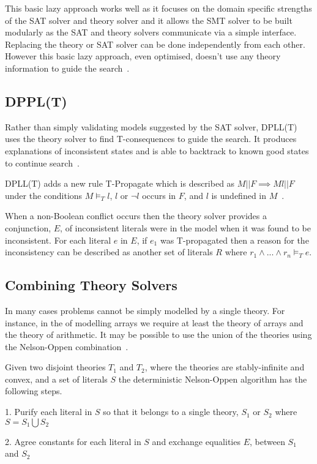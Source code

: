 \documentclass[]{final_report}
\begin{document}
This basic lazy approach works well as it focuses on the domain specific strengths of the SAT solver and theory solver and it allows the SMT solver to be built modularly as the SAT and theory solvers communicate via a simple interface. Replacing the theory or SAT solver can be done independently from each other. However this basic lazy approach, even optimised, doesn't use any theory information to guide the search~\cite{sattosmt}.

\subsection{DPPL(T)}
Rather than simply validating models suggested by the SAT solver, DPLL(T) uses the theory solver to find T-consequences to guide the search. It produces explanations of inconsistent states and is able to backtrack to known good states to continue search~\cite{smtdpplt, ganzinger2004dpll}.

DPLL(T) adds a new rule T-Propagate which is described as $M || F \implies M l || F $ under the conditions $M \models _T l$, $l$ or $\lnot l$ occurs in $F$, and $l$ is undefined in $M$~\cite{sattosmt}.

When a non-Boolean conflict occurs then the theory solver provides a conjunction, $E$, of inconsistent literals were in the model when it was found to be inconsistent.  For each literal $e $ in $E$, if $e_1$ was T-propagated then a reason for the inconsistency can be described as another set of literals $R$ where $r_1 \land ... \land r_n \models _T e$. 

\subsection{Combining Theory Solvers}
In many cases problems cannot be simply modelled by a single theory. For instance, in the of modelling arrays we require at least the theory of arrays and the theory of arithmetic. It may be possible to use the union of the theories using the Nelson-Oppen combination~\cite{smtdpplt}.

Given two disjoint theories $T_1$ and $T_2$, where the theories are stably-infinite and convex, and a set of literals $S$ the deterministic Nelson-Oppen algorithm has the following steps.

1. Purify each literal in $S$ so that it belongs to a single theory, $S_1$ or $S_2$ where $S = S_1 \bigcup S_2$

2. Agree constants for each literal in $S$ and exchange equalities $E$, between $S_1$ and $S_2$
\end{document}
